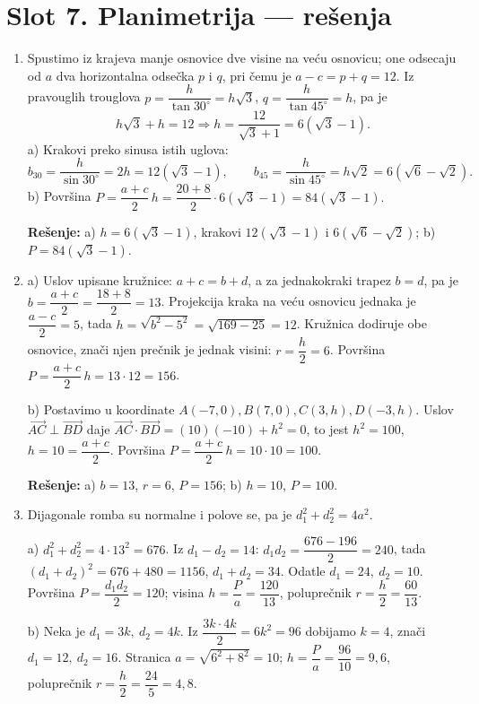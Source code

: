 \section*{Slot 7. Planimetrija — rešenja}
\begin{enumerate}[label=\arabic*.]

\item Spustimo iz krajeva manje osnovice dve visine na veću osnovicu; one odsecaju od $a$ dva horizontalna odsečka $p$ i $q$, pri čemu je $a-c=p+q=12$. Iz pravouglih trouglova $p=\dfrac{h}{\tan 30^\circ}=h\sqrt3$, $q=\dfrac{h}{\tan 45^\circ}=h$, pa je
\[ h\sqrt3+h=12 \Rightarrow h=\frac{12}{\sqrt3+1}=6(\sqrt3-1). \]
a) Krakovi preko sinusa istih uglova:
\[ b_{30}=\frac{h}{\sin 30^\circ}=2h=12(\sqrt3-1),\qquad b_{45}=\frac{h}{\sin 45^\circ}=h\sqrt2=6(\sqrt6-\sqrt2). \]
b) Površina $P=\dfrac{a+c}{2}\,h=\dfrac{20+8}{2}\cdot 6(\sqrt3-1)=84(\sqrt3-1).$

\textbf{Rešenje:} a) $h=6(\sqrt3-1)$, krakovi $12(\sqrt3-1)$ i $6(\sqrt6-\sqrt2)$; \; b) $P=84(\sqrt3-1)$.

\item a) Uslov upisane kružnice: $a+c=b+d$, a za jednakokraki trapez $b=d$, pa je $b=\dfrac{a+c}{2}=\dfrac{18+8}{2}=13$. Projekcija kraka na veću osnovicu jednaka je $\dfrac{a-c}{2}=5$, tada $h=\sqrt{b^2-5^2}=\sqrt{169-25}=12$. Kružnica dodiruje obe osnovice, znači njen prečnik je jednak visini: $r=\dfrac{h}{2}=6$. Površina $P=\dfrac{a+c}{2}\,h=13\cdot 12=156$.

b) Postavimo u koordinate $A(-7,0),B(7,0),C(3,h),D(-3,h)$. Uslov $\overrightarrow{AC}\perp\overrightarrow{BD}$ daje $\overrightarrow{AC}\cdot\overrightarrow{BD}=(10)(-10)+h^2=0$, to jest $h^2=100$, $h=10=\dfrac{a+c}{2}$. Površina $P=\dfrac{a+c}{2}\,h=10\cdot 10=100$.

\textbf{Rešenje:} a) $b=13$, $r=6$, $P=156$; \; b) $h=10$, $P=100$.

\item Dijagonale romba su normalne i polove se, pa je $d_1^2+d_2^2=4a^2$.

a) $d_1^2+d_2^2=4\cdot 13^2=676$. Iz $d_1-d_2=14$: $d_1d_2=\dfrac{676-196}{2}=240$, tada $(d_1+d_2)^2=676+480=1156$, $d_1+d_2=34$. Odatle $d_1=24,\ d_2=10$. Površina $P=\dfrac{d_1d_2}{2}=120$; visina $h=\dfrac{P}{a}=\dfrac{120}{13}$, poluprečnik $r=\dfrac{h}{2}=\dfrac{60}{13}$.

b) Neka je $d_1=3k,\ d_2=4k$. Iz $\dfrac{3k\cdot 4k}{2}=6k^2=96$ dobijamo $k=4$, znači $d_1=12,\ d_2=16$. Stranica $a=\sqrt{6^2+8^2}=10$; $h=\dfrac{P}{a}=\dfrac{96}{10}=9{,}6$, poluprečnik $r=\dfrac{h}{2}=\dfrac{24}{5}=4{,}8$.


\end{enumerate}
